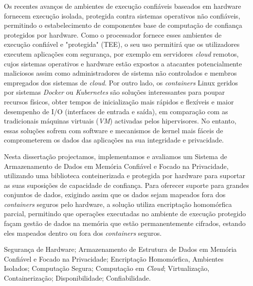 Os recentes avanços de ambientes de execução confiáveis baseados em hardware fornecem execução isolada, protegida contra sistemas operativos não confiáveis, permitindo o estabelecimento de componentes base de computação de confiança protegidos por hardware. Como o processador fornece esses ambientes de execução confiável e "protegida" \space (TEE), o seu uso permitirá que os utilizadores executem aplicações com segurança, por exemplo em servidores \textit{cloud} remotos, cujos sistemas operativos e hardware estão expostos a atacantes potencialmente maliciosos assim como administradores de sistema não controlados e membros empregados dos sistemas de \textit{cloud}.
Por outro lado, os \textit{containers} Linux geridos por sistemas \textit{Docker} ou \textit{Kubernetes} são soluções interessantes para poupar recursos físicos, obter tempos de inicialização mais rápidos e flexíveis e maior desempenho de I/O (interfaces de entrada e saída), em comparação com as tradicionais máquinas virtuais (\textit{VM}) activadas pelos hipervisores. No entanto, essas soluções sofrem com software e mecanismos de kernel mais fáceis de comprometerem os dados das aplicações na sua integridade e privacidade.

Nesta dissertação projectamos, implementamos e avaliamos um Sistema de  Armazenamento de Dados em Memória Confiável e Focado na Privacidade, utilizando uma biblioteca conteinerizada e protegida por hardware para suportar as suas suposições de capacidade de confiança. Para oferecer suporte para grandes conjuntos de dados, exigindo assim que os dados sejam mapeados fora dos \textit{containers} seguros pelo hardware, a solução utiliza encriptação homomórfica parcial, permitindo que operações executadas no ambiente de execução protegido façam gestão de dados na memória que estão permanentemente cifrados, estando eles mapeados dentro ou fora dos \textit{containers} seguros.

\begin{keywords}
Segurança de Hardware; Armazenamento de Estrutura de Dados em Memória Confiável e Focado na Privacidade; Encriptação Homomórfica, Ambientes Isolados; Computação Segura; Computação em \textit{Cloud}; Virtualização, Containerização; Disponibilidade; Confiabilidade.
\end{keywords} 
